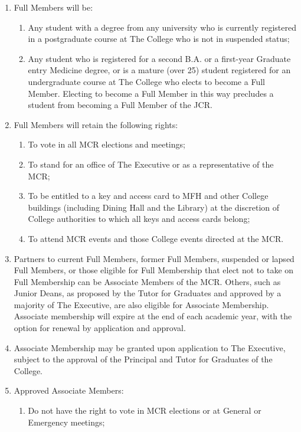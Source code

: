 \documentclass[11pt, a4paper]{article}
\begin{document}
\begin{enumerate}
	\item Full Members will be:
        \begin{enumerate}
      		\item Any student with a degree from any university who is currently registered in a postgraduate course at The College who is not in suspended status;
      		\item Any student who is registered for a second B.A. or a first-year Graduate entry Medicine degree, or is a mature (over 25) student registered for an undergraduate course  at The College who elects to become a Full Member. Electing to become a Full Member in this way precludes a student from becoming a Full Member of the JCR.
		\end{enumerate}
    \item Full Members will retain the following rights:
    	\begin{enumerate}
      		\item To vote in all MCR elections and meetings;
      		\item To stand for an office of The Executive or as a representative of the MCR;
            \item To be entitled to a key and access card to MFH and other College buildings (including Dining Hall and the Library) at the discretion of College authorities to which all keys and access cards belong;
            \item To attend MCR events and those College events directed at the MCR.
		\end{enumerate}
	\item Partners to current Full Members, former Full Members, suspended or lapsed Full Members, or those eligible for Full Membership that elect not to take on Full Membership can be Associate Members of the MCR. Others, such as Junior Deans, as proposed by the Tutor for Graduates and approved by a majority of The Executive, are also eligible for Associate Membership. Associate membership will expire at the end of each academic year, with the option for renewal by application and approval.
    \item Associate Membership may be granted upon application to The Executive, subject to the approval of the Principal and Tutor for Graduates of the College.
    \item Approved Associate Members:
    	\begin{enumerate}
      		\item Do not have the right to vote in MCR elections or at General or Emergency meetings;

\end{enumerate}
\end{enumerate}
\end{document}
